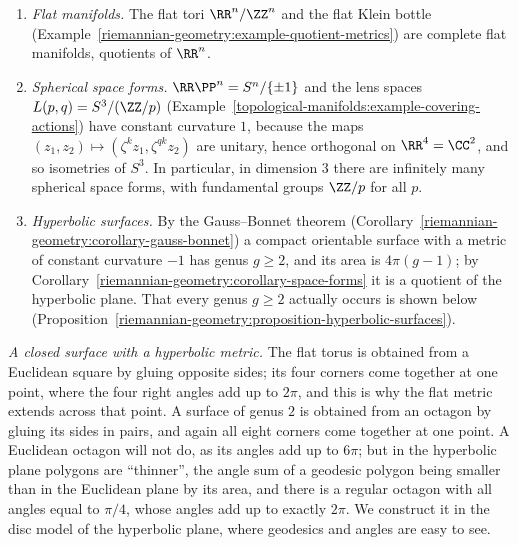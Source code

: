 \begin{example}\label{riemannian-geometry:example-space-forms}
\begin{enumerate}
\item \emph{Flat manifolds.} The flat tori $\RR^n/\ZZ^n$ and the flat Klein bottle (Example~\ref{riemannian-geometry:example-quotient-metrics}) are complete flat manifolds,
quotients of $\RR^n$.
\item \emph{Spherical space forms.} $\RR\PP^n = S^n/\{\pm1\}$ and the lens spaces $L(p, q) = S^3/(\ZZ/p)$ (Example~\ref{topological-manifolds:example-covering-actions})
have constant curvature $1$, because the maps $(z_1, z_2) \mapsto (\zeta^kz_1, \zeta^{qk}z_2)$ are unitary, hence orthogonal on $\RR^4 = \CC^2$, and so isometries of
$S^3$. In particular, in dimension $3$ there are infinitely many spherical space forms, with fundamental groups $\ZZ/p$ for all $p$.
\item \emph{Hyperbolic surfaces.} By the Gauss--Bonnet theorem (Corollary~\ref{riemannian-geometry:corollary-gauss-bonnet}) a compact orientable surface with a metric of
constant curvature $-1$ has genus $g \geq 2$, and its area is $4\pi(g - 1)$; by Corollary~\ref{riemannian-geometry:corollary-space-forms} it is a quotient of the hyperbolic
plane. That every genus $g \geq 2$ actually occurs is shown below (Proposition~\ref{riemannian-geometry:proposition-hyperbolic-surfaces}).
\end{enumerate}
\end{example}

\emph{A closed surface with a hyperbolic metric.} The flat torus is obtained from a Euclidean square by gluing opposite sides; its four corners come together at one point, where the four
right angles add up to $2\pi$, and this is why the flat metric extends across that point. A surface of genus $2$ is obtained from an octagon by gluing its sides in pairs, and again all eight
corners come together at one point. A Euclidean octagon will not do, as its angles add up to $6\pi$; but in the hyperbolic plane polygons are ``thinner'', the angle sum of a geodesic polygon
being smaller than in the Euclidean plane by its area, and there is a regular octagon with all angles equal to $\pi/4$, whose angles add up to exactly $2\pi$. We construct it in the disc model of
the hyperbolic plane, where geodesics and angles are easy to see.

